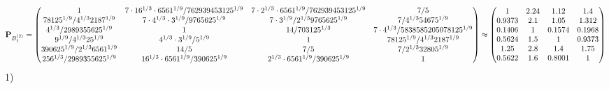 \documentclass[10pt,a4paper]{article}
\begin{document}
	\[
		\bold{P}_{B_1^{(2)}} = 
		\begin{pmatrix}
			{1}{} & {{7} \cdot {16^ {1 / 3}} \cdot {6561^ {1 / 9}}} / {{762939453125^ {1 / 9}}} & {{7} \cdot {2^ {1 / 3}} \cdot {6561^ {1 / 9}}} / {{762939453125^ {1 / 9}}} & {{7}} / {{5}} \\
			{{78125^ {1 / 9}}} / {{4^ {1 / 3}}{2187^ {1 / 9}}} & {{7} \cdot {4^ {1 / 3}} \cdot {3^ {1 / 9}}} / {{9765625^ {1 / 9}}} & {{7} \cdot {3^ {1 / 9}}} / {{2^ {1 / 3}}{9765625^ {1 / 9}}} & {{7}} / {{4^ {1 / 3}}{54675^ {1 / 9}}} \\
			{{4^ {1 / 3}}} / {{2989355625^ {1 / 9}}} & {1}{} & {{14}} / {{703125^ {1 / 3}}} & {{7} \cdot {4^ {1 / 3}}} / {{5838585205078125^ {1 / 9}}} \\
			{{9^ {1 / 9}}} / {{4^ {1 / 3}}{25^ {1 / 9}}} & {{4^ {1 / 3}} \cdot {3^ {1 / 9}}} / {{5^ {1 / 9}}} & {1}{} & {{78125^ {1 / 9}}} / {{4^ {1 / 3}}{2187^ {1 / 9}}} \\
			{{390625^ {1 / 9}}} / {{2^ {1 / 3}}{6561^ {1 / 9}}} & {{14}} / {{5}} & {{7}} / {{5}} & {{7}} / {{2^ {1 / 3}}{32805^ {1 / 9}}} \\
			{{256^ {1 / 3}}} / {{2989355625^ {1 / 9}}} & {{16^ {1 / 3}} \cdot {6561^ {1 / 9}}} / {{390625^ {1 / 9}}} & {{2^ {1 / 3}} \cdot {6561^ {1 / 9}}} / {{390625^ {1 / 9}}} & {1}{} \\
		\end{pmatrix}
		\approx
		\begin{pmatrix}
			1        & 2.24     & 1.12     & 1.4      \\
			0.9373   & 2.1      & 1.05     & 1.312    \\
			0.1406   & 1        & 0.1574   & 0.1968   \\
			0.5624   & 1.5      & 1        & 0.9373   \\
			1.25     & 2.8      & 1.4      & 1.75     \\
			0.5622   & 1.6      & 0.8001   & 1        \\
		\end{pmatrix}
	\]
	1)
\end{document}
